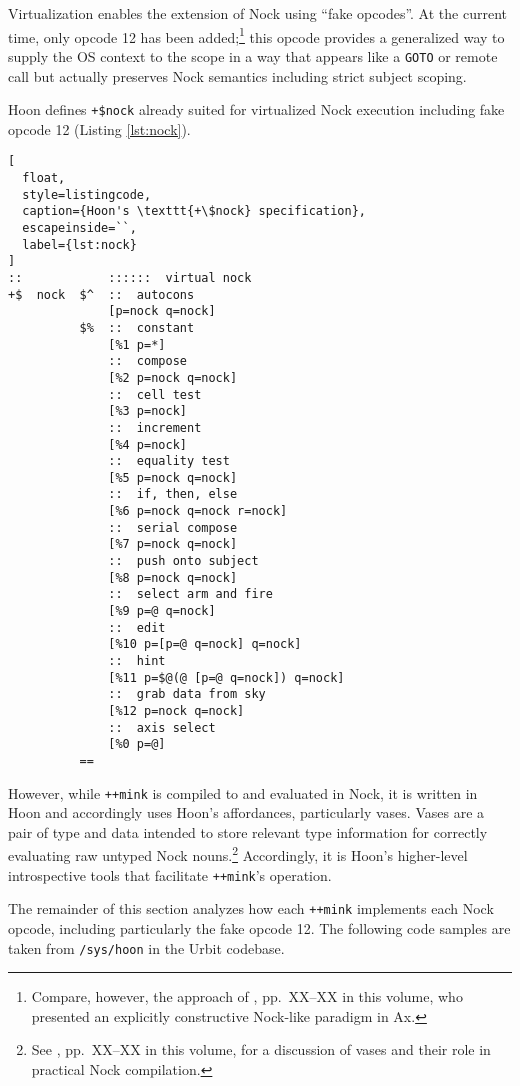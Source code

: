 \documentclass[twoside]{article}
\begin{document}
Virtualization enables the extension of Nock using ``fake opcodes''.  At the current time, only opcode 12 has been added;\footnote{Compare, however, the approach of \citet{Atman2025}, pp.~XX–XX in this volume, who presented an explicitly constructive Nock-like paradigm in Ax.} this opcode provides a generalized way to supply the OS context to the scope in a way that appears like a \texttt{GOTO} or remote call but actually preserves Nock semantics including strict subject scoping.


Hoon defines \lstinline[style=inlinecode]{+$nock} already suited for virtualized Nock execution including fake opcode 12 (Listing \ref{lst:nock}).

\begin{lstlisting}[
  float,
  style=listingcode,
  caption={Hoon's \texttt{+\$nock} specification},
  escapeinside=``,
  label={lst:nock}
]
::            ::::::  virtual nock
+$  nock  $^  ::  autocons
              [p=nock q=nock]
          $%  ::  constant
              [%1 p=*]
              ::  compose
              [%2 p=nock q=nock]
              ::  cell test
              [%3 p=nock]
              ::  increment
              [%4 p=nock]
              ::  equality test
              [%5 p=nock q=nock]
              ::  if, then, else
              [%6 p=nock q=nock r=nock]
              ::  serial compose
              [%7 p=nock q=nock]
              ::  push onto subject
              [%8 p=nock q=nock]
              ::  select arm and fire
              [%9 p=@ q=nock]
              ::  edit
              [%10 p=[p=@ q=nock] q=nock]
              ::  hint
              [%11 p=$@(@ [p=@ q=nock]) q=nock]
              ::  grab data from sky
              [%12 p=nock q=nock]
              ::  axis select
              [%0 p=@]
          ==
\end{lstlisting}

However, while \lstinline[style=inlinecode]{++mink} is compiled to and evaluated in Nock, it is written in Hoon and accordingly uses Hoon's affordances, particularly vases.  Vases are a pair of type and data intended to store relevant type information for correctly evaluating raw untyped Nock nouns.\footnote{See \citet{Davis2025}, pp.~XX–XX in this volume, for a discussion of vases and their role in practical Nock compilation.}  Accordingly, it is Hoon's higher-level introspective tools that facilitate \lstinline[style=inlinecode]{++mink}'s operation.

The remainder of this section analyzes how each \lstinline[style=inlinecode]{++mink} implements each Nock opcode, including particularly the fake opcode 12.  The following code samples are taken from \lstinline[style=inlinecode]{/sys/hoon} in the Urbit codebase.
\end{document}
